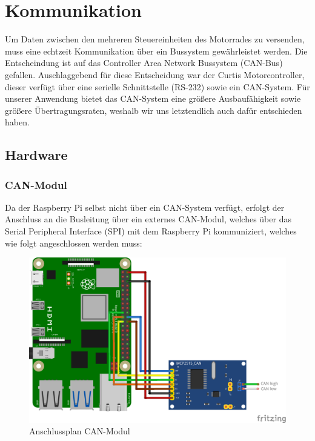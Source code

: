 \newpage


\section{Kommunikation}
Um Daten zwischen den mehreren Steuereinheiten des Motorrades zu versenden, muss eine echtzeit Kommunikation über ein Bussystem gewährleistet werden. Die Entscheindung ist auf das Controller Area Network Bussystem (CAN-Bus) gefallen. Auschlaggebend für diese Entscheidung war der Curtis Motorcontroller, dieser verfügt über eine serielle Schnittstelle (RS-232) sowie ein CAN-System. Für unserer Anwendung bietet das CAN-System eine größere Ausbaufähigkeit sowie größere Übertragungsraten, weshalb wir uns letztendlich auch dafür entschieden haben.
\subsection{Hardware}
\subsubsection{CAN-Modul}
Da der Raspberry Pi selbst nicht über ein CAN-System verfügt, erfolgt der Anschluss an die Busleitung über ein externes CAN-Modul, welches über das Serial Peripheral Interface (SPI) mit dem Raspberry Pi kommuniziert, welches wie folgt angeschlossen werden muss: 
\begin{figure}[H]
	\begin{center}
		\includegraphics[scale=0.9]{figures/hcis/can_module.png}
		\caption{Anschlussplan CAN-Modul}
	\end{center}
\end{figure}

